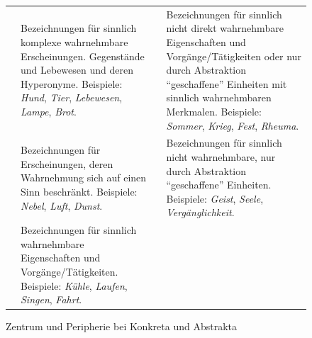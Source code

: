 \begin{figure}[h]
\begin{center}
\baselineskip
{\footnotesize\begin{tabularx}{\textwidth}{@{}lQlQ@{}}
 & Bezeichnungen für sinnlich komplexe wahrnehmbare Erscheinungen. Gegenstände und Lebewesen und deren Hyperonyme. Beispiele: \textit{Hund}, \textit{Tier}, \textit{Lebewesen}, \textit{Lampe}, \textit{Brot}.
&  & Bezeichnungen für sinnlich nicht direkt wahrnehmbare Eigenschaften und Vorgänge\slash Tätigkeiten oder nur durch Abstraktion "`geschaffene"' Einheiten mit sinnlich wahrnehmbaren Merkmalen. Beispiele: \textit{Sommer}, \textit{Krieg}, \textit{Fest}, \textit{Rheuma}.\\
 & Bezeichnungen für Erscheinungen, deren Wahrnehmung sich auf einen Sinn beschränkt. Beispiele: \textit{Nebel}, \textit{Luft}, \textit{Dunst}.
&  & Bezeichnungen für sinnlich nicht wahrnehmbare, nur durch Abstraktion "`geschaffene"' Einheiten. Beispiele: \textit{Geist}, \textit{Seele}, \textit{Vergänglichkeit}.\\
 & Bezeichnungen für sinnlich wahrnehmbare Eigenschaften und Vorgänge\slash Tätigkeiten. Beispiele: \textit{Kühle}, \textit{Laufen}, \textit{Singen}, \textit{Fahrt}.
\end{tabularx}}
\caption {Zentrum und Peripherie bei Konkreta  und Abstrakta  \parencite[41]{Schrauf2011}}
\label{abb:schrauf-ewald}
\end{center}
\end{figure}


